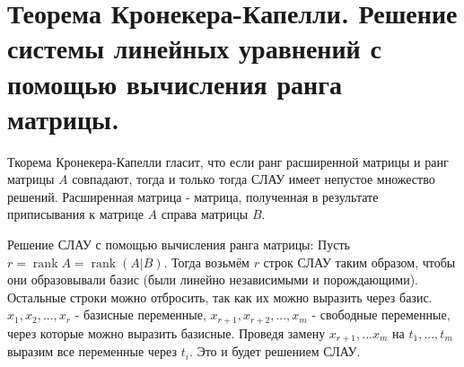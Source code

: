 \documentclass[12pt]{article}
\DeclareMathOperator{\rank}{rank}
\begin{document}
\begin{sloppypar}
    \section{Теорема Кронекера-Капелли. Решение системы линейных уравнений с помощью вычисления ранга матрицы.}
    Ткорема Кронекера-Капелли гласит, что если ранг расширенной матрицы и ранг матрицы $A$ совпадают, тогда и только тогда СЛАУ имеет непустое множество решений. Расширенная матрица - матрица, полученная в результате приписывания к матрице $A$ справа матрицы $B$.

    Решение СЛАУ с помощью вычисления ранга матрицы:
    Пусть $r = \rank A = \rank (A|B)$. Тогда возьмём $r$ строк СЛАУ таким образом, чтобы они образовывали базис (были линейно независимыми и порождающими). Остальные строки можно отбросить, так как их можно выразить через базис. $x_1, x_2, ..., x_r$ - базисные переменные, $x_{r + 1}, x_{r + 2}, ..., x_{m}$ - свободные переменные, через которые можно выразить базисные. Проведя замену $x_{r + 1}, ... x_{m}$ на $t_1, ..., t_m$ выразим все переменные через $t_i$. Это и будет решением СЛАУ.


\end{sloppypar}
\end{document}
